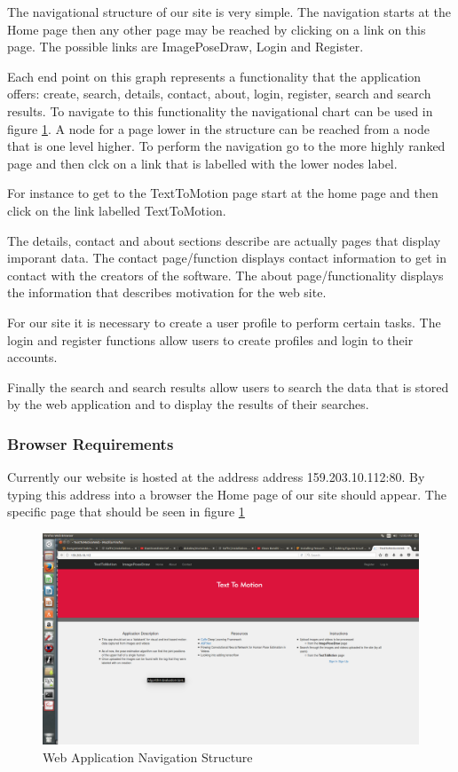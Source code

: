 \documentclass{scrreprt}
\begin{document}
The navigational structure of our site is very simple.  The navigation starts at the Home page then any other page may be reached by clicking on a link on this page.  The possible links are ImagePoseDraw, Login and Register.

 Each end point on this graph represents a functionality that the application offers: create, search, details, contact, about, login, register, search and search results.
To navigate to this functionality the navigational chart can be used in figure \ref{fig:homePage}.  A node for a page lower in the structure can be reached from a node that is one level higher.  To perform the navigation go to the more highly ranked page and then clck on a link that is labelled with the lower nodes label.

For instance to get to the TextToMotion page start at the home page and then click on the link labelled TextToMotion.

The details, contact and about sections describe are actually pages that display imporant data.  The contact page/function displays contact information to get in contact with the creators of the software.  The about page/functionality displays the information that describes motivation for the web site.

For our site it is necessary to create a user profile to perform certain tasks.  The login and register functions allow users to create profiles and login to their accounts.

Finally the search and search results allow users to search the data that is stored by the web application and to display the results of their searches.

\subsubsection{Browser Requirements}
Currently our website is hosted at the address address 159.203.10.112:80. By typing this address into a browser the Home page of our site should appear. The specific page that should be seen in figure \ref{fig:homePage}

\begin{figure}
  \includegraphics[width=\linewidth]{HomePage.png}
  \caption{Web Application Navigation Structure}
  \label{fig:homePage}
\end{figure}
\end{document}
